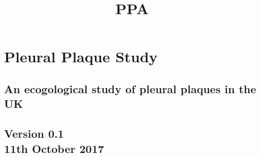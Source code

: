 \documentclass[a4paper,10pt]{article}
\title{\bf PPA}
\date{}
\begin{document}
\pagestyle{fancy} 
\maketitle

\section*{Pleural Plaque Study}
 \subsection*{An ecogological study of pleural plaques in the UK}

\vspace{3cm}

\begin{centering}
\subsection*{Version 0.1 \\ 11th October 2017}
\end{centering}
\end{document}
